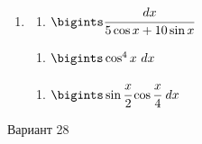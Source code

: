 \documentclass{article}
\begin{document}
\begin{multicols}{2}
\begin{enumerate}[label=\Roman*.]
		\item
		\begin{multicols}{3}
			\begin{enumerate}[label=\arabic*.]
				\setlength\itemsep{1em}
				\item $\bigints\cfrac{dx}{5\cos x + 10 \sin x}$
			\end{enumerate}
			\vfill\null\columnbreak
			\begin{enumerate}[label=\arabic*., start=2]
				\setlength\itemsep{1em}
				\item $\bigints\cos^4x\ dx$
			\end{enumerate}
			\vfill\null\columnbreak
			\begin{enumerate}[label=\arabic*., start=3]
				\setlength\itemsep{1em}
				\item $\bigints\sin\cfrac{x}{2}\cos\cfrac{x}{4}\ dx$
			\end{enumerate}
			\vfill\null\columnbreak
		\end{multicols}
	\end{enumerate}
	
	\vfill\null\columnbreak
	
	\centerline{Вариант 28}
	

\end{multicols}
\end{document}

